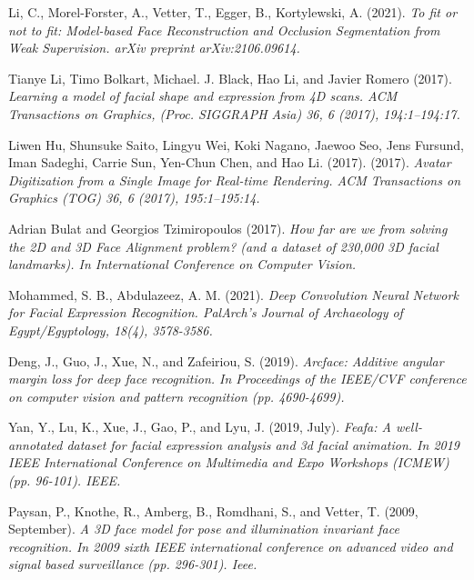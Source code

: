 \documentclass[12pt,a4]{article}
\begin{document}
\begin{thebibliography}{9}
	Li, C., Morel-Forster, A., Vetter, T., Egger, B., Kortylewski, A. (2021).
	\textit{To fit or not to fit: Model-based Face Reconstruction and Occlusion Segmentation from Weak Supervision. arXiv preprint arXiv:2106.09614.}
	
	Tianye Li, Timo Bolkart, Michael. J. Black, Hao Li, and Javier Romero
	(2017).
	\textit{Learning a model of facial shape and expression from 4D scans.
		ACM Transactions on Graphics, (Proc. SIGGRAPH Asia) 36, 6 (2017),
		194:1–194:17.}
	
	Liwen Hu, Shunsuke Saito, Lingyu Wei, Koki Nagano, Jaewoo Seo, Jens
	Fursund, Iman Sadeghi, Carrie Sun, Yen-Chun Chen, and Hao Li. (2017).
	(2017).
	\textit{Avatar Digitization from a Single Image for Real-time Rendering. ACM
		Transactions on Graphics (TOG) 36, 6 (2017), 195:1–195:14.}
	
	Adrian Bulat and Georgios Tzimiropoulos (2017).
	\textit{How far are we from
		solving the 2D and 3D Face Alignment problem? (and a dataset of
		230,000 3D facial landmarks). In International Conference on Computer
		Vision.}
	
	Mohammed, S. B., Abdulazeez, A. M. (2021).
	\textit{Deep Convolution Neural
		Network for Facial Expression Recognition. PalArch’s Journal of Archaeology of Egypt/Egyptology, 18(4), 3578-3586.}
	
	Deng, J., Guo, J., Xue, N., and Zafeiriou, S. (2019).
	\textit{Arcface: Additive angular margin loss for deep face recognition. In Proceedings of the
		IEEE/CVF conference on computer vision and pattern recognition (pp.
		4690-4699).}
	
	Yan, Y., Lu, K., Xue, J., Gao, P., and Lyu, J. (2019, July).
	\textit{Feafa: A
		well-annotated dataset for facial expression analysis and 3d facial animation. In 2019 IEEE International Conference on Multimedia and Expo
		Workshops (ICMEW) (pp. 96-101). IEEE.}
	
	Paysan, P., Knothe, R., Amberg, B., Romdhani, S., and Vetter, T. (2009, September).
	\textit{A 3D face model for pose and illumination invariant
		face recognition. In 2009 sixth IEEE international conference on advanced
		video and signal based surveillance (pp. 296-301). Ieee.}
	
	\end{thebibliography}
\end{document}
